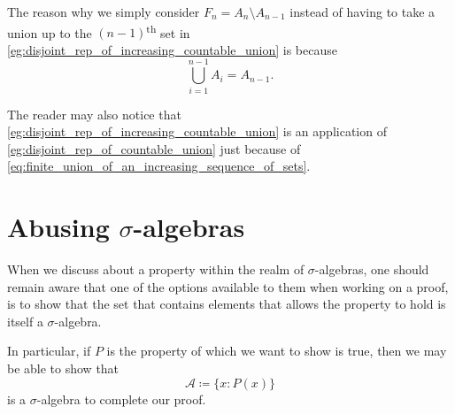 \documentclass[notoc,notitlepage]{tufte-book}
\begin{document}
\begin{remark}
  The reason why we simply consider $F_n = A_n \setminus A_{n-1}$ instead
  of having to take a union up to the $(n-1)$\textsuperscript{th}
  set in \cref{eg:disjoint_rep_of_increasing_countable_union}
  is because
  \begin{equation}\label{eq:finite_union_of_an_increasing_sequence_of_sets}
    \bigcup_{i=1}^{n-1} A_i = A_{n-1}.
  \end{equation}

  The reader may also notice that
  \cref{eg:disjoint_rep_of_increasing_countable_union}
  is an application of \cref{eg:disjoint_rep_of_countable_union}
  just because of \cref{eq:finite_union_of_an_increasing_sequence_of_sets}.
\end{remark}

\section{Abusing $\sigma$-algebras}%
\label{sec:abusing_sigma_algebras}

When we discuss about a property within the realm of $\sigma$-algebras,
one should remain aware that one of the options available to them
when working on a proof, is to show that the set that contains elements
that allows the property to hold is itself a $\sigma$-algebra.

In particular, if $P$ is the property of which we want to show is true,
then we may be able to show that
\begin{equation*}
  \mathcal{A} \coloneqq \{ x : P(x) \}
\end{equation*}
is a $\sigma$-algebra to complete our proof.


\backmatter

\fancyhead[LE]{\thepage \enspace \textsl{\leftmark}}



\printindex
\end{document}
